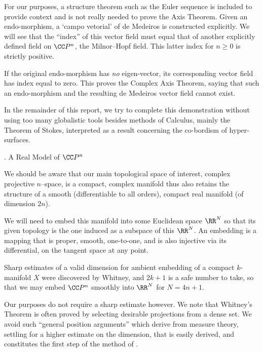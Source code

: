 For our purposes, a structure theorem such as the Euler sequence is included to provide context and is not really needed to prove the Axis Theorem. Given an endo-morphism, a `campo vetorial' of de Medeiros is constructed explicitly. We will see that the ``index'' of this vector field must equal that of another explicitly defined field on $\CC P^n$, the Milnor--Hopf field. This latter index for $n \geq 0$ is strictly positive.

If the original endo-morphism has {\it no} eigen-vector, its corresponding vector field has index equal to zero. This proves the Complex Axis Theorem, saying that such an endo-morphism and the resulting de Medeiros vector field cannot exist.

In the remainder of this report, we try to complete this demonstration without using too many globalistic tools besides methods of Calculus, mainly the Theorem of Stokes, interpreted as a result concerning the   co-bordism of hyper-surfaces.

. A Real Model of $\CC P^n$\endhead

We should be aware that our main topological space of interest, complex projective $n$--space, is a compact, complex manifold thus also retains the structure of a smooth (differentiable to all orders), compact real manifold (of dimension $2n$).

We will need to embed this manifold into some Euclidean space $\RR^N$ so that its given topology is the one induced as a subspace of this $\RR^N$. An embedding is a mapping that is proper, smooth, one-to-one, and is also injective via its differential, on the tangent space at any point.

Sharp estimates of a valid dimension for ambient embedding of a compact $k$-manifold $X$ were discovered by Whitney, and $2k+1$ is a safe number to take, so that we may embed $\CC P^n$ smoothly into $\RR^N$ for $N = 4n+1$.

Our purposes do not require a sharp estimate however. We note that Whitney's Theorem is often proved by selecting desirable projections from a dense set. We avoid such ``general position arguments'' which derive from measure theory, settling for a higher estimate on the dimension, that is easily derived, and constitutes the first step of the method of \cite{Whitney}.

